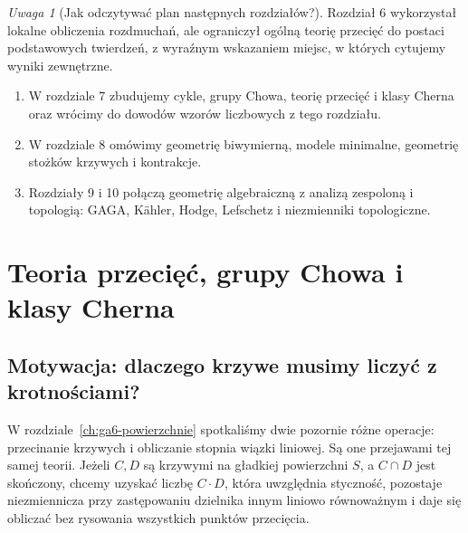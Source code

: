\documentclass[11pt,a4paper,openany]{report}
\numberwithin{equation}{section}
\theoremstyle{plain}
\theoremstyle{definition}
\theoremstyle{remark}
\newtheorem{uwaga}[twierdzenie]{Uwaga}
\begin{document}
\begin{uwaga}[Jak odczytywać plan następnych rozdziałów?]
Rozdział 6 wykorzystał lokalne obliczenia rozdmuchań,
ale ograniczył ogólną teorię przecięć do postaci
podstawowych twierdzeń, z wyraźnym wskazaniem miejsc,
w których cytujemy wyniki zewnętrzne.
\begin{enumerate}[label=(\roman*)]
\item W rozdziale 7 zbudujemy cykle, grupy Chowa,
      teorię przecięć i klasy Cherna oraz wrócimy
      do dowodów wzorów liczbowych z tego rozdziału.
\item W rozdziale 8 omówimy geometrię biwymierną,
      modele minimalne, geometrię stożków krzywych
      i kontrakcje.
\item Rozdziały 9 i 10 połączą geometrię algebraiczną
      z analizą zespoloną i topologią: GAGA, Kähler,
      Hodge, Lefschetz i niezmienniki topologiczne.
\end{enumerate}
\end{uwaga}





\chapter{Teoria przecięć, grupy Chowa i klasy Cherna}
\label{ch:ga7-chow-chern}

\providecommand{\atlasref}[2]{#2}


\section{Motywacja: dlaczego krzywe musimy liczyć z krotnościami?}
\label{sec:ga7-motivation}

W rozdziale~\ref{ch:ga6-powierzchnie} spotkaliśmy dwie pozornie różne
operacje: przecinanie krzywych i obliczanie stopnia wiązki liniowej.
Są one przejawami tej samej teorii. Jeżeli $C,D$ są krzywymi na
gładkiej powierzchni $S$, a $C\cap D$ jest skończony, chcemy
uzyskać liczbę $C\cdot D$, która uwzględnia styczność,
pozostaje niezmiennicza przy zastępowaniu dzielnika innym
liniowo równoważnym i daje się obliczać bez rysowania
wszystkich punktów przecięcia.
\end{document}
